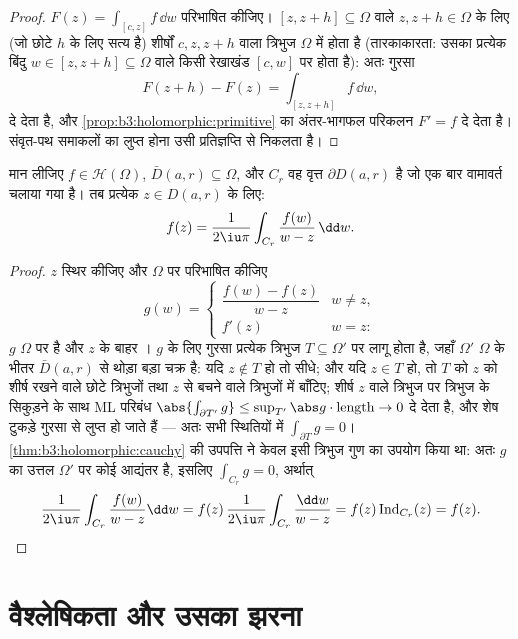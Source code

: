 \begin{proof}
$F(z) = \int_{[c,z]}f\,\dd w$ परिभाषित कीजिए। $[z, z+h] \subseteq \Omega$ वाले $z, z + h \in
\Omega$ के लिए (जो छोटे $h$ के
लिए सत्य है) शीर्षों $c, z, z+h$ वाला त्रिभुज $\Omega$ में होता है
(तारकाकारता: उसका प्रत्येक बिंदु $w \in [z, z+h] \subseteq \Omega$ वाले किसी रेखाखंड $[c,
w]$
पर होता है): अतः गुरसा
\[
F(z + h) - F(z) = \int_{[z, z+h]}f\,\dd w,
\]
दे देता है, और \cref{prop:b3:holomorphic:primitive} का अंतर-भागफल परिकलन $F' = f$ दे देता है।
संवृत-पथ समाकलों का लुप्त होना उसी प्रतिज्ञप्ति से निकलता है।
\end{proof}

\begin{theorem}[कोशी का समाकल सूत्र]
\label{thm:b3:holomorphic:formula}
मान लीजिए $f \in \mathcal H(\Omega)$, $\bar D(a, r) \subseteq
\Omega$, और $C_r$ वह वृत्त $\partial D(a,r)$ है जो एक बार
वामावर्त चलाया गया है। तब प्रत्येक $z \in D(a, r)$ के लिए:
\[
f(z) = \frac1{2\iu\pi}\int_{C_r}\frac{f(w)}{w - z}\,\dd w .
\]
\end{theorem}

\begin{proof}
$z$ स्थिर कीजिए और $\Omega$ पर परिभाषित कीजिए
\[
g(w) = \begin{cases}
\dfrac{f(w) - f(z)}{w - z} & w \neq z,\\[4pt]
f'(z) & w = z :
\end{cases}
\]
$g$ $\Omega$ पर  है और $z$ के बाहर । $g$ के लिए
गुरसा प्रत्येक त्रिभुज $T \subseteq \Omega'$ पर लागू होता है, जहाँ $\Omega'$ $\Omega$ के
भीतर $\bar D(a,r)$ से थोड़ा बड़ा चक्र है: यदि $z \notin T$ हो तो सीधे; और यदि
$z \in T$ हो, तो $T$ को $z$ को शीर्ष रखने वाले छोटे त्रिभुजों तथा
$z$ से बचने वाले त्रिभुजों में बाँटिए; शीर्ष $z$ वाले त्रिभुज
पर त्रिभुज के सिकुड़ने के साथ ML परिबंध $\abs{\int_{\partial T'}g} \leq \sup_{T'}\abs
g\cdot\operatorname{length} \to 0$ दे देता है, और शेष
टुकड़े गुरसा से लुप्त हो जाते हैं --- अतः सभी स्थितियों में $\int_{\partial T}g = 0$।
\cref{thm:b3:holomorphic:cauchy} की उपपत्ति ने केवल इसी त्रिभुज गुण का उपयोग किया था: अतः
$g$ का उत्तल $\Omega'$ पर कोई आद्यंतर है, इसलिए $\int_{C_r}g = 0$, अर्थात्
\[
\frac1{2\iu\pi}\int_{C_r}\frac{f(w)}{w - z}\dd w
= f(z)\,\frac{1}{2\iu\pi}\int_{C_r}\frac{\dd w}{w - z}
= f(z)\operatorname{Ind}_{C_r}(z) = f(z) .
\]
\end{proof}

\section{वैश्लेषिकता और उसका झरना}

